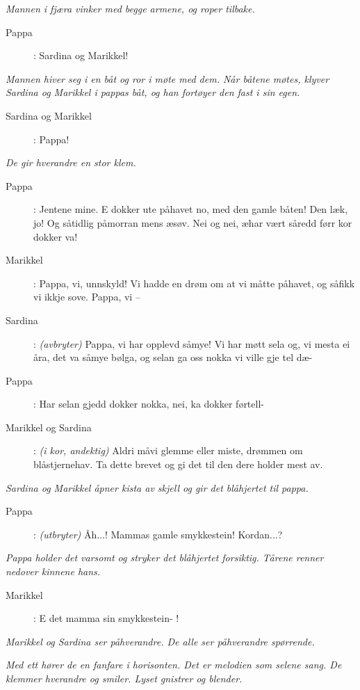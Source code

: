 {\noindent \textit{\color{gray} Mannen i fj\ae ra vinker med begge armene, og roper tilbake.}

\begin{description}
\item[Pappa]: Sardina og Marikkel!
\end{description}

\noindent \textit{\color{gray} Mannen hiver seg i en b\aa t og ror i m\o{}te med dem. N\aa r b\aa tene m\o{}tes, klyver Sardina og Marikkel i pappas b\aa t, og han fort\o{}yer den fast i sin egen.}

\begin{description}
\item[Sardina og Marikkel]: Pappa! 
\end{description}

\noindent \textit{\color{gray} De gir hverandre en stor klem.}

\begin{description}
\item[Pappa]: Jentene mine. E dokker ute p\aa  havet no, med den gamle b\aa ten! Den l\ae k, jo! Og s\aa  tidlig p\aa  morran mens \ae  s\o{}v. Nei og nei, \ae  har v\ae rt s\aa  redd f\o{}rr kor dokker va! 
\item[Marikkel]: Pappa, vi, unnskyld! Vi hadde en dr\o{}m om at vi m\aa tte p\aa  havet, og s\aa  fikk vi ikkje sove. Pappa, vi --
\item[Sardina]: \textit{\color{gray} (avbryter)} Pappa, vi har opplevd s\aa  mye! Vi har m\o{}tt sela og, vi mesta ei \aa ra, det va s\aa  mye b\o{}lga, og selan ga oss nokka vi ville gje tel d\ae -
\item[Pappa]: Har selan gjedd dokker nokka, nei, ka dokker f\o{}rtell- 
\item[Marikkel og Sardina]: \textit{\color{gray} (i kor, andektig)} Aldri m\aa  vi glemme eller miste, dr\o{}mmen om bl\aa stjernehav. Ta dette brevet og gi det til den dere holder mest av. 
\end{description}

\noindent \textit{\color{gray} Sardina og Marikkel \aa pner kista av skjell og gir det bl\aa  hjertet til pappa.}

\begin{description}
\item[Pappa]: \textit{\color{gray} (utbryter)} \AA h...! Mammas gamle smykkestein! Kordan...?
\end{description}

\noindent \textit{\color{gray} Pappa holder det varsomt og stryker det bl\aa  hjertet forsiktig. T\aa rene renner nedover kinnene hans.}

\begin{description}
\item[Marikkel]: E det mamma sin smykkestein- ! 
\end{description}

\noindent \textit{\color{gray} Marikkel og Sardina ser p\aa  hverandre. De alle ser p\aa  hverandre sp\o{}rrende.} 

\noindent \textit{\color{gray} Med ett h\o{}rer de en fanfare i horisonten. Det er melodien som selene sang. De klemmer hverandre og smiler. Lyset gnistrer og blender.}
\color{black}
\label{shtp2}}

